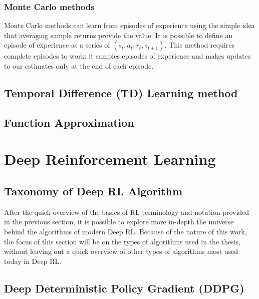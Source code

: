 \subsubsection{Monte Carlo methods}

Monte Carlo methods can learn from episodes of experience using the simple idea that averaging sample returns provide the value. It is possible to define an episode of experience as a series of $(s_t, a_t, r_t, s_{t+1})$. This method requires complete episodes to work: it samples episodes of experience and makes updates to our estimates only at the end of each episode.

\subsection{Temporal Difference (TD) Learning method}

\subsection{Function Approximation}

\section{Deep Reinforcement Learning} \label{deepreinflearn}


\subsection{Taxonomy of Deep RL Algorithm}

After the quick overview of the basics of RL terminology and notation provided in the previous section, it is possible to explore more in-depth the universe behind the algorithms of modern Deep RL. Because of the nature of this work, the focus of this section will be on the types of algorithms used in the thesis, without leaving out a quick overview of other types of algorithms most used today in Deep RL.

\subsection{Deep Deterministic Policy Gradient (DDPG)}

